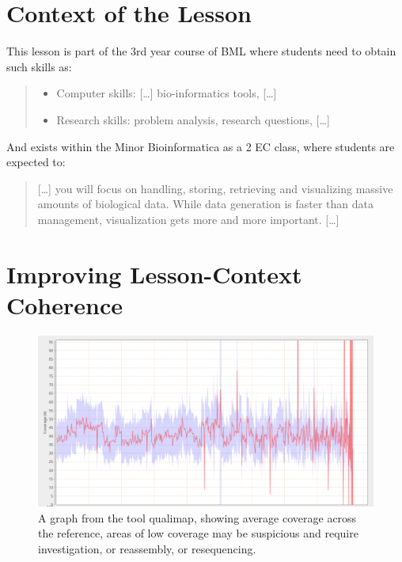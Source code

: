 \documentclass[paper=a4,justified,a4paper]{tufte-handout}
\providecommand{\tightlist}{%
  \setlength{\itemsep}{0pt}\setlength{\parskip}{0pt}}
\begin{document}
\hypertarget{context-of-the-lesson}{%
\section{Context of the Lesson}\label{context-of-the-lesson}}

This lesson is part of the 3rd year course of BML where students need to
obtain such skills as:

\begin{quote}
\begin{itemize}
\tightlist
\item
  Computer skills: {[}\ldots{}{]} bio-informatics tools, {[}\ldots{}{]}
\item
  Research skills: problem analysis, research questions, {[}\ldots{}{]}
\end{itemize}
\end{quote}

And exists within the Minor Bioinformatica as a 2 EC class, where
students are expected to:

\begin{quote}
{[}\ldots{}{]} you will focus on handling, storing, retrieving and
visualizing massive amounts of biological data. While data generation is
faster than data management, visualization gets more and more important.
{[}\ldots{}{]}
\end{quote}

\hypertarget{improving-lesson-context-coherence}{%
\section{Improving Lesson-Context
Coherence}\label{improving-lesson-context-coherence}}

\begin{figure}
\centering
\includegraphics{./coverage.png}
\caption{A graph from the tool qualimap, showing average coverage across
the reference, areas of low coverage may be suspicious and require
investigation, or reassembly, or resequencing.\label{fig:qualimap}}
\end{figure}
\end{document}
